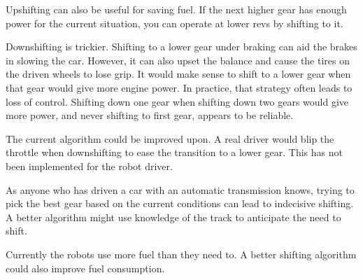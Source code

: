 \documentclass{article}
\begin{document}
Upshifting can also be useful for saving fuel.  If the next higher gear has
enough power for the current situation, you can operate at lower revs by
shifting to it.

Downshifting is trickier.  Shifting to a lower gear under braking can aid the
brakes in slowing the car.  However, it can also upset the balance and cause the
tires on the driven wheels to lose grip.  It would make sense to shift to a
lower gear when that gear would give more engine power.  In practice, that
strategy often leads to loss of control.  Shifting down one gear when shifting
down two gears would give more power, and never shifting to first gear, appears
to be reliable.

The current algorithm could be improved upon.  A real driver would blip the
throttle when downshifting to ease the transition to a lower gear.  This has not
been implemented for the robot driver.

As anyone who has driven a car with an automatic transmission knows, trying to
pick the best gear based on the current conditions can lead to indecisive
shifting.  A better algorithm might use knowledge of the track to anticipate the
need to shift.

Currently the robots use more fuel than they need to.  A better shifting
algorithm could also improve fuel consumption.
\end{document}
